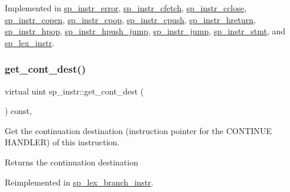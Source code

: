 Implemented in \mbox{\hyperlink{classsp__instr__error_a62783095595470174aa88d3499d58bea}{sp\+\_\+instr\+\_\+error}}, \mbox{\hyperlink{classsp__instr__cfetch_a10a1b6c9bbf720a85ccce90f7163aed1}{sp\+\_\+instr\+\_\+cfetch}}, \mbox{\hyperlink{classsp__instr__cclose_abe0cc169c3f0e26238946c52eb686745}{sp\+\_\+instr\+\_\+cclose}}, \mbox{\hyperlink{classsp__instr__copen_af627252195677aeb974ac0a704c50dbf}{sp\+\_\+instr\+\_\+copen}}, \mbox{\hyperlink{classsp__instr__cpop_ab995e94b2fe0a9b9cfac848ba2d04df9}{sp\+\_\+instr\+\_\+cpop}}, \mbox{\hyperlink{classsp__instr__cpush_a7d372bf13da26255682db5ea8da893b0}{sp\+\_\+instr\+\_\+cpush}}, \mbox{\hyperlink{classsp__instr__hreturn_a8491a8712319d0ba1b698c18ae4d8b48}{sp\+\_\+instr\+\_\+hreturn}}, \mbox{\hyperlink{classsp__instr__hpop_ab6a85bd2f0acc39580c6febfaa081767}{sp\+\_\+instr\+\_\+hpop}}, \mbox{\hyperlink{classsp__instr__hpush__jump_a5ecf945e7fa0e56f22447a64a6fa545e}{sp\+\_\+instr\+\_\+hpush\+\_\+jump}}, \mbox{\hyperlink{classsp__instr__jump_a2b76438345358e22b6029129828d66d5}{sp\+\_\+instr\+\_\+jump}}, \mbox{\hyperlink{classsp__instr__stmt_a81682f344607fafa2bdac0075b636d85}{sp\+\_\+instr\+\_\+stmt}}, and \mbox{\hyperlink{classsp__lex__instr_a1cb4c51d92402e942d15ea95e57785dd}{sp\+\_\+lex\+\_\+instr}}.

\mbox{\label{classsp__instr_a3430a1d05e78933479736c452d555b1e}} 
\subsubsection{\texorpdfstring{get\+\_\+cont\+\_\+dest()}{get\_cont\_dest()}}
{\footnotesize\ttfamily virtual uint sp\+\_\+instr\+::get\+\_\+cont\+\_\+dest (\begin{DoxyParamCaption}{ }\end{DoxyParamCaption}) const\hspace{0.3cm}{\ttfamily [inline]}, {\ttfamily [virtual]}}

Get the continuation destination (instruction pointer for the C\+O\+N\+T\+I\+N\+UE H\+A\+N\+D\+L\+ER) of this instruction. \begin{DoxyReturn}{Returns}
the continuation destination 
\end{DoxyReturn}


Reimplemented in \mbox{\hyperlink{classsp__lex__branch__instr_a5e6dfdf34d9f45fb3f2d2386029b95c6}{sp\+\_\+lex\+\_\+branch\+\_\+instr}}.

